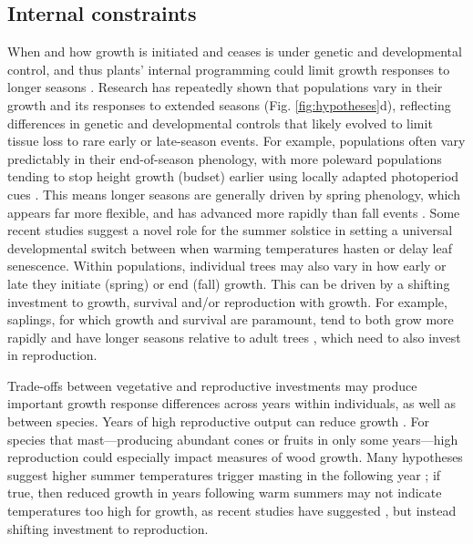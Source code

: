 \documentclass[11pt]{article}
\begin{document}
\subsection*{Internal constraints}
When and how growth is initiated and ceases is under genetic and developmental control, and thus plants' internal programming could limit growth responses to longer seasons \citep{marchand2021timing,mckown2016impacts,soolanayakanahally2013timing}. Research has repeatedly shown that populations vary in their growth and its responses to extended seasons (Fig. \ref{fig:hypotheses}d), reflecting differences in genetic and developmental controls that likely evolved to limit tissue loss to rare early or late-season events. For example, populations often vary predictably in their end-of-season phenology, with more poleward populations tending to stop height growth (budset) earlier using locally adapted photoperiod cues \citep{soolanayakanahally2013timing,aitken2016}. This means longer seasons are generally driven by spring phenology, which appears far more flexible, and has advanced more rapidly than fall events \citep{aitken2016}. Some recent studies suggest a novel role for the summer solstice \citep{zohner2023effect} in setting a universal developmental switch between when warming temperatures hasten or delay leaf senescence. Within populations, individual trees may also vary in how early or late they initiate (spring) or end (fall) growth. This can be driven by a shifting investment to growth, survival and/or reproduction with growth. For example, saplings, for which growth and survival are paramount, tend to both grow more rapidly \citep{hilty2021plant} and have longer seasons relative to adult trees \citep{augspurger2003differences,rozendaal2010tropical,vitasse2014earlier}, which need to also invest in reproduction. %

Trade-offs between vegetative and reproductive investments may produce important growth response differences across years within individuals, as well as between species. Years of high reproductive output can reduce growth \citep{thomas2011bookchptr,hacket2016tree}. For species that mast---producing abundant cones or fruits in only some years---high reproduction could especially impact measures of wood growth. Many hypotheses suggest higher summer temperatures trigger masting in the following year \citep{hacket2016tree,hacket2016consistent}; if true, then reduced growth in years following warm summers may not indicate temperatures too high for growth, as recent studies have suggested \citep[e.g.][]{gantois2022new,dow2022warm}, but instead shifting investment to reproduction.
\end{document}
